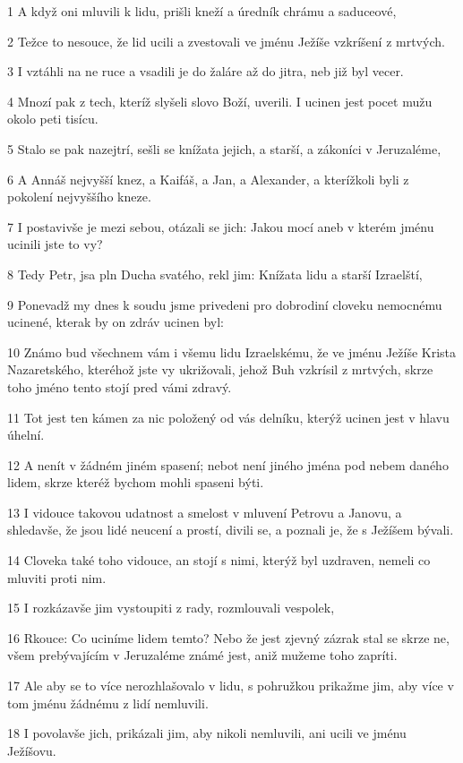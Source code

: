 \par 1 A když oni mluvili k lidu, prišli kneží a úredník chrámu a saduceové,
\par 2 Težce to nesouce, že lid ucili a zvestovali ve jménu Ježíše vzkríšení z mrtvých.
\par 3 I vztáhli na ne ruce a vsadili je do žaláre až do jitra, neb již byl vecer.
\par 4 Mnozí pak z tech, kteríž slyšeli slovo Boží, uverili. I ucinen jest pocet mužu okolo peti tisícu.
\par 5 Stalo se pak nazejtrí, sešli se knížata jejich, a starší, a zákoníci v Jeruzaléme,
\par 6 A Annáš nejvyšší knez, a Kaifáš, a Jan, a Alexander, a kterížkoli byli z pokolení nejvyššího kneze.
\par 7 I postavivše je mezi sebou, otázali se jich: Jakou mocí aneb v kterém jménu ucinili jste to vy?
\par 8 Tedy Petr, jsa pln Ducha svatého, rekl jim: Knížata lidu a starší Izraelští,
\par 9 Ponevadž my dnes k soudu jsme privedeni pro dobrodiní cloveku nemocnému ucinené, kterak by on zdráv ucinen byl:
\par 10 Známo bud všechnem vám i všemu lidu Izraelskému, že ve jménu Ježíše Krista Nazaretského, kteréhož jste vy ukrižovali, jehož Buh vzkrísil z mrtvých, skrze toho jméno tento stojí pred vámi zdravý.
\par 11 Tot jest ten kámen za nic položený od vás delníku, kterýž ucinen jest v hlavu úhelní.
\par 12 A nenít v žádném jiném spasení; nebot není jiného jména pod nebem daného lidem, skrze kteréž bychom mohli spaseni býti.
\par 13 I vidouce takovou udatnost a smelost v mluvení Petrovu a Janovu, a shledavše, že jsou lidé neucení a prostí, divili se, a poznali je, že s Ježíšem bývali.
\par 14 Cloveka také toho vidouce, an stojí s nimi, kterýž byl uzdraven, nemeli co mluviti proti nim.
\par 15 I rozkázavše jim vystoupiti z rady, rozmlouvali vespolek,
\par 16 Rkouce: Co uciníme lidem temto? Nebo že jest zjevný zázrak stal se skrze ne, všem prebývajícím v Jeruzaléme známé jest, aniž mužeme toho zapríti.
\par 17 Ale aby se to více nerozhlašovalo v lidu, s pohružkou prikažme jim, aby více v tom jménu žádnému z lidí nemluvili.
\par 18 I povolavše jich, prikázali jim, aby nikoli nemluvili, ani ucili ve jménu Ježíšovu.
